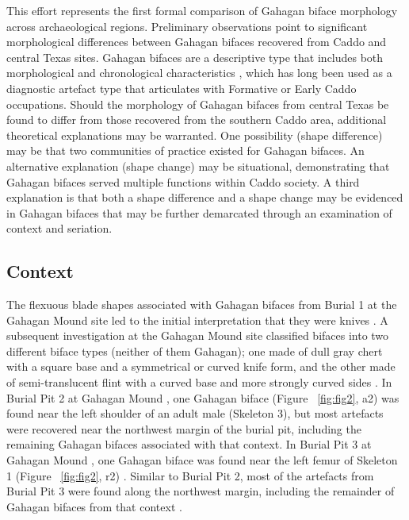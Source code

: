 \documentclass[review]{elsarticle}
\begin{document}
This effort represents the first formal comparison of Gahagan biface morphology across archaeological regions. Preliminary observations point to significant morphological differences between Gahagan bifaces recovered from Caddo and central Texas sites. Gahagan bifaces are a descriptive type that includes both morphological and chronological characteristics \citep{RN20847}, which has long been used as a diagnostic artefact type that articulates with Formative or Early Caddo occupations. Should the morphology of Gahagan bifaces from central Texas be found to differ from those recovered from the southern Caddo area, additional theoretical explanations may be warranted. One possibility (shape difference) may be that two communities of practice existed for Gahagan bifaces. An alternative explanation (shape change) may be situational, demonstrating that Gahagan bifaces served multiple functions within Caddo society. A third explanation is that both a shape difference and a shape change may be evidenced in Gahagan bifaces that may be further demarcated through an examination of context and seriation.

\subsection*{Context}

The flexuous blade shapes associated with Gahagan bifaces from Burial 1 at the Gahagan Mound site led to the initial interpretation that they were knives \citep[Figures 18-21]{RN2740}. A subsequent investigation at the Gahagan Mound site classified bifaces into two different biface types (neither of them Gahagan); one made of dull gray chert with a square base and a symmetrical or curved knife form, and the other made of semi-translucent flint with a curved base and more strongly curved sides \citep{RN5274}. In Burial Pit 2 at Gahagan Mound \citep[Plate 21]{RN5274}, one Gahagan biface (Figure ~\ref{fig:fig2}, a2) \citep[Plate 27, No. 1, 3]{RN5274} was found near the left shoulder of an adult male (Skeleton 3), but most artefacts were recovered near the northwest margin of the burial pit, including the remaining Gahagan bifaces associated with that context. In Burial Pit 3 at Gahagan Mound \citep[Plate 23, 1]{RN5274}, one Gahagan biface was found near the left femur of Skeleton 1 (Figure ~\ref{fig:fig2}, r2) \citep[Plate 27, No. 1, 2]{RN5274}. Similar to Burial Pit 2, most of the artefacts from Burial Pit 3 were found along the northwest margin, including the remainder of Gahagan bifaces from that context \citep{RN5274}.
\end{document}
